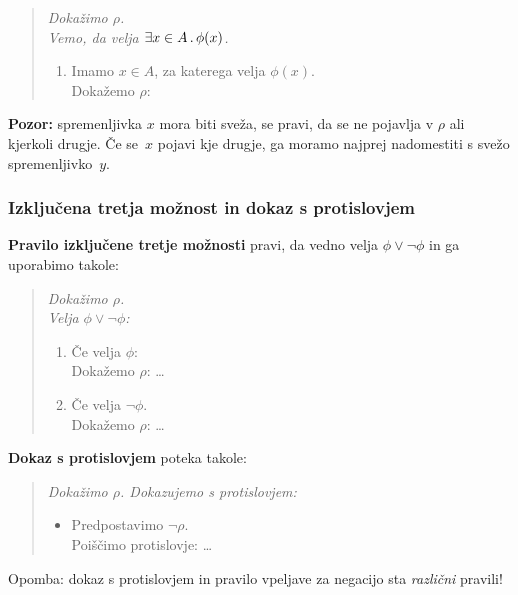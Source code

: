 \begin{quote}
  \sl
  Dokažimo $\rho$.\\
  Vemo, da velja $\exists x \in A \,.\, \phi(x)$.
  \begin{enumerate}
  \item[] Imamo $x \in A$, za katerega velja $\phi(x)$.\\
       Dokažemo $\rho$: \quad {}
  \end{enumerate}
\end{quote}
%
\textbf{Pozor:} spremenljivka $x$ mora biti sveža, se pravi, da se ne pojavlja v $\rho$ ali kjerkoli drugje. Če se~$x$ pojavi kje drugje, ga moramo najprej nadomestiti s svežo spremenljivko~$y$.

\subsubsection{Izključena tretja možnost in dokaz s protislovjem}

\textbf{Pravilo izključene tretje možnosti} pravi, da vedno velja $\phi \lor \lnot\phi$ in ga uporabimo takole:
%
\begin{quote}
  \sl
  Dokažimo $\rho$.\\
  Velja $\phi \lor \lnot \phi$:
  \begin{enumerate}
  \item Če velja $\phi$:\\
        Dokažemo $\rho$: \quad \dots
  \item Če velja $\lnot\phi$. \\
        Dokažemo $\rho$: \quad \dots
  \end{enumerate}
\end{quote}
%
\textbf{Dokaz s protislovjem} poteka takole:
%
\begin{quote}
  \sl
  Dokažimo $\rho$. Dokazujemo s protislovjem:
  \begin{itemize}
  \item[] Predpostavimo $\lnot\rho$.\\
        Poiščimo protislovje: \quad \dots
  \end{itemize}
\end{quote}
%
Opomba: dokaz s protislovjem in pravilo vpeljave za negacijo sta \emph{različni}
pravili!
